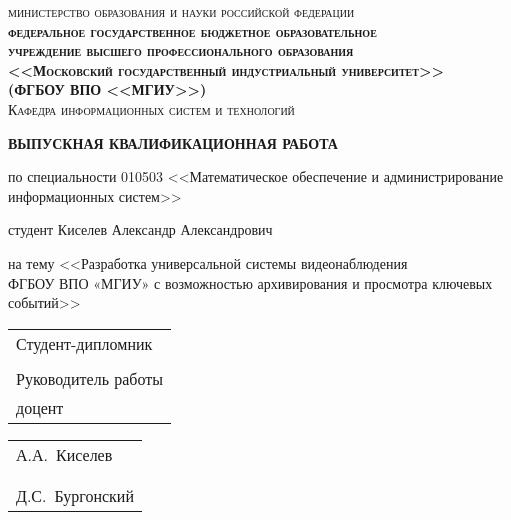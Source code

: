 \documentclass[a4paper,12pt,oneside]{memoir}
\begin{document}
\mainmatter
\noindent
\thispagestyle{empty}

\vspace*{-\headheight}\vspace*{-\headsep}

\begin{center}
\textsc{
министерство образования и науки российской федерации\\
\textbf{\small{федеральное государственное бюджетное образовательное\\
учреждение высшего профессионального образования\\
<<Московский государственный индустриальный университет>>}\\
(ФГБОУ ВПО <<МГИУ>>)}\\
Кафедра информационных систем и технологий\\
}

\vspace{3cm plus 1mm minus 1mm}


{\LARGE\textbf{ВЫПУСКНАЯ КВАЛИФИКАЦИОННАЯ РАБОТА}}

\vspace{1cm plus 1mm minus 1mm}

{\large
по специальности 010503 <<Математическое обеспечение и администрирование информационных систем>>

\vspace{1cm plus 1mm minus 1mm}

студент Киселев Александр Александрович

\vspace{1cm plus 1mm minus 1mm}

на тему <<Разработка универсальной системы видеонаблюдения\\
ФГБОУ ВПО «МГИУ» с возможностью архивирования и просмотра ключевых событий>>\\

\vfill
\vspace{2cm plus 1mm minus 1mm}

\begin{tabular}{l}
Студент-дипломник\\
\\
Руководитель работы\\
доцент\\
\end{tabular}
\hfill
\begin{tabular}{l}
А.\+А.~Киселев\\
\\
\\
Д.\+С.~Бургонский\\
\end{tabular}

}
\end{center}
\end{document}
